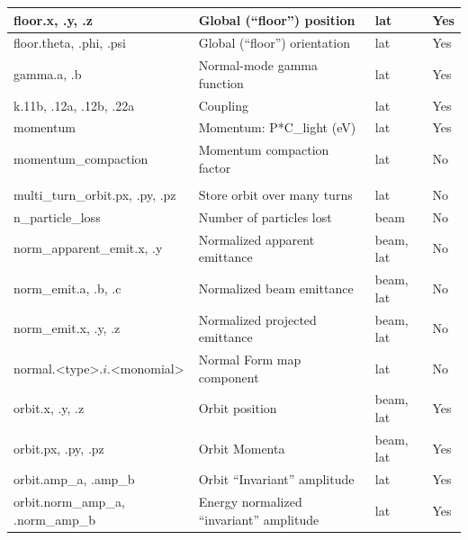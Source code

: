 {\begin{longtable}{llll}
  floor.x, .y, .z                     & Global (``floor'') position                   & lat         & Yes \\ \hline 
  floor.theta, .phi, .psi             & Global (``floor'') orientation                & lat         & Yes \\ \hline 

  gamma.a, .b                         & Normal-mode gamma function                    & lat         & Yes \\ \hline 

  k.11b, .12a, .12b, .22a             & Coupling                                      & lat         & Yes \\ \hline 

  momentum                            & Momentum: P*C_light (eV)                      & lat         & Yes \\ \hline
  momentum_compaction                 & Momentum compaction factor                    & lat         & No  \\ \hline

  \begin{tabular}{@{}l}   
    multi_turn_orbit.x, .y, .z \\ 
    multi_turn_orbit.px, .py, .pz
  \end{tabular}                       & Store orbit over many turns                   & lat         & No  \\ \hline 

  n_particle_loss                     & Number of particles lost                      & beam        & No  \\ \hline 

  norm_apparent_emit.x, .y            & Normalized apparent emittance                 & beam, lat   & No  \\ \hline
  norm_emit.a, .b, .c                 & Normalized beam emittance                     & beam, lat   & No  \\ \hline 
  norm_emit.x, .y, .z                 & Normalized projected emittance                & beam, lat   & No  \\ \hline 
  normal.<type>.$i$.<monomial>        & Normal Form map component                     & lat         & No  \\ \hline
  
  orbit.x, .y, .z                     & Orbit position                                & beam, lat   & Yes \\ \hline 
  orbit.px, .py, .pz                  & Orbit Momenta                                 & beam, lat   & Yes \\ \hline 
  orbit.amp_a, .amp_b                 & Orbit ``Invariant'' amplitude                 & lat         & Yes \\ \hline 
  orbit.norm_amp_a, .norm_amp_b       & Energy normalized ``invariant'' amplitude     & lat         & Yes \\ \hline 


\end{longtable}}
